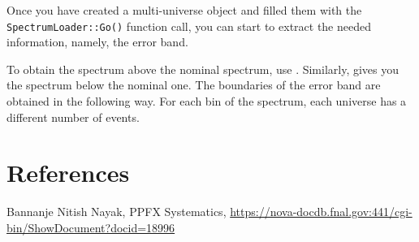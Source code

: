 \documentclass[12pt,a4paper,final]{iopart}
\begin{document}
Once you have created a multi-universe object and filled them with the \texttt{SpectrumLoader::Go()} function call, you can start to extract the needed information, namely, the error band.

To obtain the spectrum above the nominal spectrum, use . Similarly,  gives you the spectrum below the nominal one. The boundaries of the error band are obtained in the following way. For each bin of the spectrum, each universe has a different number of events.

\section*{References}
\begin{thebibliography}{10}
   Bannanje Nitish Nayak, PPFX Systematics, \url{https://nova-docdb.fnal.gov:441/cgi-bin/ShowDocument?docid=18996}
\end{thebibliography}
  
\end{document}
